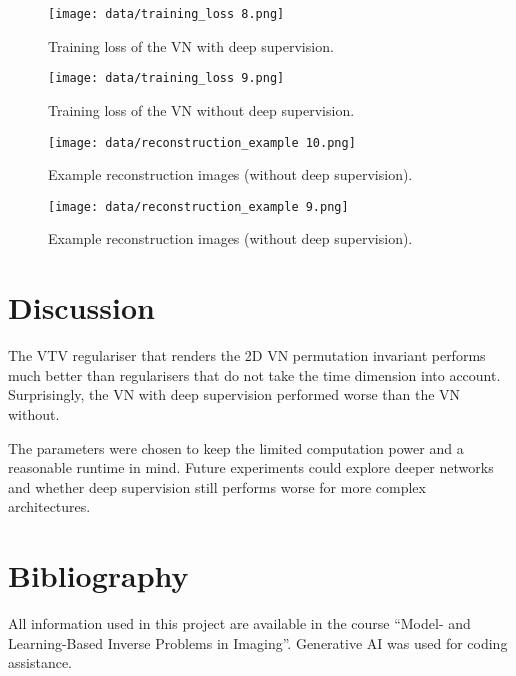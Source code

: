 \begin{figure}[h]
  \centering
  \texttt{[image: data/training\_loss 8.png]}
  \caption{Training loss of the VN with deep supervision.}
\end{figure}

\begin{figure}[h]
  \centering
  \texttt{[image: data/training\_loss 9.png]}
  \caption{Training loss of the VN without deep supervision.}
\end{figure}

\begin{figure}[h]
  \centering
  \texttt{[image: data/reconstruction\_example 10.png]}
  \caption{Example reconstruction images (without deep supervision).}
\end{figure}

\begin{figure}[h]
  \centering
  \texttt{[image: data/reconstruction\_example 9.png]}
  \caption{Example reconstruction images (without deep supervision).}
\end{figure}

\chapter{Discussion}

The VTV regulariser that renders the 2D VN permutation invariant performs much better than regularisers that do not take the time dimension into account. Surprisingly, the VN with deep supervision performed worse than the VN without.

The parameters were chosen to keep the limited computation power and a reasonable runtime in mind. Future experiments could explore deeper networks and whether deep supervision still performs worse for more complex architectures.

\chapter{Bibliography}

All information used in this project are available in the course ``Model- and Learning-Based Inverse Problems in Imaging''. Generative AI was used for coding assistance.

